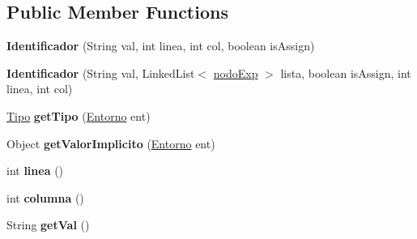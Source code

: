 \subsection*{Public Member Functions}
\begin{DoxyCompactItemize}
\item 
\mbox{\label{classast_1_1expresiones_1_1_identificador_ab35b2c54733b35e02d6a3172796aae5b}} 
{\bfseries Identificador} (String val, int linea, int col, boolean is\+Assign)
\item 
\mbox{\label{classast_1_1expresiones_1_1_identificador_a12a41c653049188119a77e6ed03b8d20}} 
{\bfseries Identificador} (String val, Linked\+List$<$ \mbox{\hyperlink{classentorno_1_1nodo_exp}{nodo\+Exp}} $>$ lista, boolean is\+Assign, int linea, int col)
\item 
\mbox{\label{classast_1_1expresiones_1_1_identificador_a21e953d172a1343dc7c8057c597cad67}} 
\mbox{\hyperlink{classentorno_1_1_tipo}{Tipo}} {\bfseries get\+Tipo} (\mbox{\hyperlink{classentorno_1_1_entorno}{Entorno}} ent)
\item 
\mbox{\label{classast_1_1expresiones_1_1_identificador_abe016822639c1e988f2ff989467b8907}} 
Object {\bfseries get\+Valor\+Implicito} (\mbox{\hyperlink{classentorno_1_1_entorno}{Entorno}} ent)
\item 
\mbox{\label{classast_1_1expresiones_1_1_identificador_a9d43f250c69d1c685fb26ca496c55880}} 
int {\bfseries linea} ()
\item 
\mbox{\label{classast_1_1expresiones_1_1_identificador_a00cc3e1ec5c836c7aca530c3a26f4807}} 
int {\bfseries columna} ()
\item 
\mbox{\label{classast_1_1expresiones_1_1_identificador_ae1e89a9747cd5668df0751e3e58d10ca}} 
String {\bfseries get\+Val} ()
\item 
\mbox{\label{classast_1_1expresiones_1_1_identificador_aeb1ee3da3a5be1f0438acd943af1f882}} 

\end{DoxyCompactItemize}
